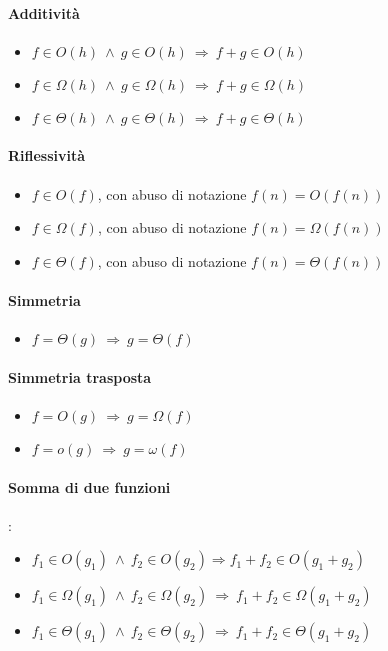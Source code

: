 \documentclass{article}
\begin{document}
\paragraph{Additività}
\begin{itemize}
    \item $f \in O(h) \ \wedge \ g \in O(h) \ \Rightarrow \ f + g \in O(h)$
    \item $f \in \Omega(h) \ \wedge \ g \in \Omega(h) \ \Rightarrow \ f + g \in \Omega(h)$
    \item $f \in \Theta(h) \ \wedge \ g \in \Theta(h) \ \Rightarrow \ f + g \in \Theta(h)$
\end{itemize}
\paragraph{Riflessività}
\begin{itemize}
    \item $f \in O(f)$, con abuso di notazione $f(n) = O(f(n))$
    \item $f \in \Omega(f)$, con abuso di notazione $f(n) = \Omega(f(n))$
    \item $f \in \Theta(f)$, con abuso di notazione $f(n) = \Theta(f(n))$
\end{itemize}
\paragraph{Simmetria}
\begin{itemize}
    \item $f = \Theta(g) \ \Rightarrow \ g = \Theta(f)$
\end{itemize}
\paragraph{Simmetria trasposta}
\begin{itemize}
    \item $f = O(g) \ \Rightarrow \ g = \Omega(f)$
    \item $f = o(g) \ \Rightarrow \ g = \omega(f)$
\end{itemize}
\paragraph{Somma di due funzioni}: 
\begin{itemize}
    \item $f_1 \in O(g_1) \ \wedge \ f_2 \in O(g_2) \Rightarrow f_1 + f_2 \in O(g_1 + g_2)$
    \item $f_1 \in \Omega(g_1) \ \wedge \ f_2 \in \Omega(g_2) \ \Rightarrow \ f_1 + f_2 \in \Omega(g_1 + g_2)$
    \item $f_1 \in \Theta(g_1) \ \wedge \ f_2 \in \Theta(g_2) \ \Rightarrow \ f_1 + f_2 \in \Theta(g_1 + g_2)$
\end{itemize}
\end{document}
